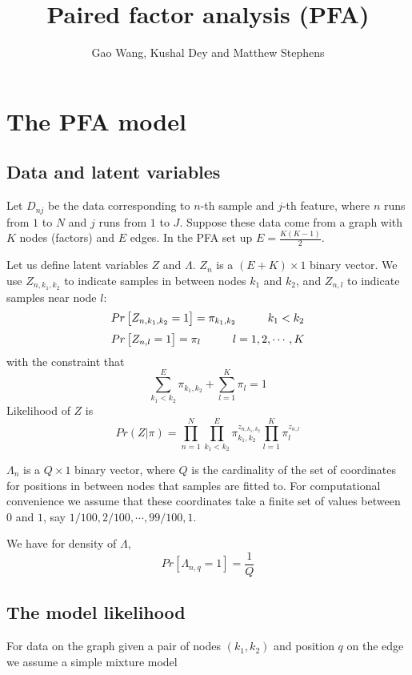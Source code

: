 \documentclass[11pt,authoryear]{article}
\begin{document}
\singlespacing
\title{Paired factor analysis (PFA)}
\author{Gao Wang, Kushal Dey and Matthew Stephens}
\maketitle

\section{The PFA model}

\subsection{Data and latent variables}
Let $D_{nj}$ be the data corresponding to $n$-th sample and $j$-th feature, 
where $n$ runs from $1$ to $N$ and $j$ runs from $1$ to $J$.  
Suppose these data come from a graph with $K$ nodes (factors) and $E$ edges. In the
PFA set up $E=\frac{K(K-1)}{2}$.

Let us define latent variables $Z$ and $\Lambda$. $Z_{n}$ is a $(E+K)
\times 1$ binary vector. We use $Z_{n,k_1,k_2}$ to indicate samples in between
nodes $k_1$ and $k_2$, and $Z_{n,l}$ to indicate samples near node $l$:
$$ Pr \left [ Z_{n, k_1, k_2} = 1 \right ] = \pi_{k_1,k_2} \hspace{1 cm} k_1 < k_2$$
$$ Pr \left [ Z_{n, l} = 1 \right ] = \pi_{l} \hspace{1 cm} l=1,2, \cdots, K$$
with the constraint that
$$ \sum_{k_1 < k_2}^E \pi_{k_1, k_2} + \sum_{l=1}^{K} \pi_{l} = 1 $$
Likelihood of $Z$ is
$$  Pr (Z |  \pi )  = \prod_{n=1}^{N} \prod_{k_1 < k_2}^E \pi_{k_1,k_2}^{z_{n,k_1,k_2}} \prod_{l=1}^{K} \pi_{l}^{z_{n,l}} $$

$\Lambda_{n}$ is a $Q \times 1$ binary vector, where $Q$ is the cardinality of
the set of coordinates for positions in between nodes that samples are fitted
to. For computational convenience we assume that these coordinates take a finite 
set of values between $0$ and $1$, say $1/100, 2/100, \cdots, 99/100, 1$.

We have for density of $\Lambda$,
$$ Pr \left [ \Lambda_{n, q} = 1 \right ] = \frac{1}{Q} $$


\subsection{The model likelihood}
For data on the graph given a pair of nodes $(k_1, k_2)$ and position $q$ on the
edge we assume a simple mixture model 
\end{document}

